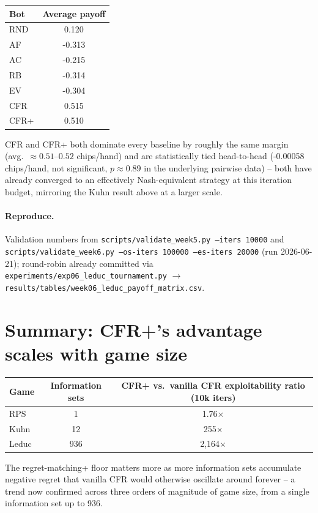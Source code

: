 \documentclass[11pt]{article}
\newcommand{\code}[1]{\texttt{#1}}
\begin{document}
\begin{center}
\begin{tabular}{lc}
\toprule
Bot & Average payoff \\
\midrule
RND & 0.120 \\
AF & -0.313 \\
AC & -0.215 \\
RB & -0.314 \\
EV & -0.304 \\
CFR & 0.515 \\
CFR+ & 0.510 \\
\bottomrule
\end{tabular}
\end{center}

CFR and CFR+ both dominate every baseline by roughly the same margin (avg.\
$\approx 0.51$--$0.52$ chips/hand) and are statistically tied head-to-head (-0.00058
chips/hand, not significant, $p \approx 0.89$ in the underlying pairwise data) -- both
have already converged to an effectively Nash-equivalent strategy at this iteration
budget, mirroring the Kuhn result above at a larger scale.

\paragraph{Reproduce.} Validation numbers from \code{scripts/validate\_week5.py
--iters 10000} and \code{scripts/validate\_week6.py --os-iters 100000 --es-iters
20000} (run 2026-06-21); round-robin already committed via
\code{experiments/exp06\_leduc\_tournament.py} $\rightarrow$
\code{results/tables/week06\_leduc\_payoff\_matrix.csv}.

\section*{Summary: CFR+'s advantage scales with game size}

\begin{center}
\begin{tabular}{lcc}
\toprule
Game & Information sets & CFR+ vs.\ vanilla CFR exploitability ratio (10k iters) \\
\midrule
RPS & 1 & 1.76$\times$ \\
Kuhn & 12 & 255$\times$ \\
Leduc & 936 & 2{,}164$\times$ \\
\bottomrule
\end{tabular}
\end{center}

The regret-matching+ floor matters more as more information sets accumulate negative
regret that vanilla CFR would otherwise oscillate around forever -- a trend now
confirmed across three orders of magnitude of game size, from a single information set
up to 936.
\end{document}
